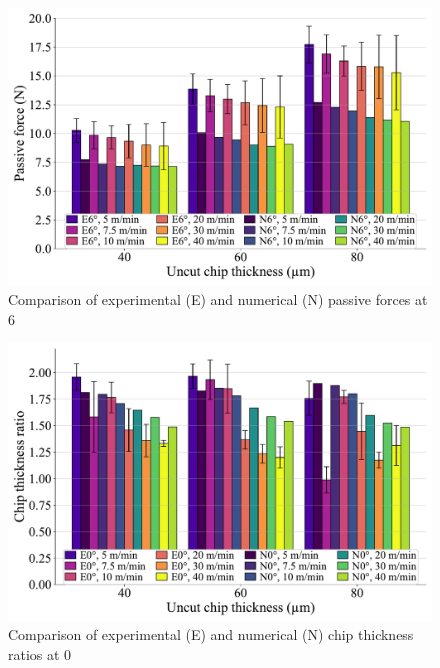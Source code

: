 \documentclass[preprint,12pt,times]{elsarticle}
\begin{document}
\begin{figure}[h]
\centering
\includegraphics[width = 140 mm]{Figures/Fz_6}
\caption{Comparison of experimental (E) and numerical (N) passive forces at 6\textdegree{}}
\label{Fz_6}
\end{figure}

\begin{figure}[h]
\centering
\includegraphics[width = 140 mm]{Figures/h0}
\caption{Comparison of experimental (E) and numerical (N) chip thickness ratios at 0\textdegree{}}
\label{h0}
\end{figure}
\end{document}
